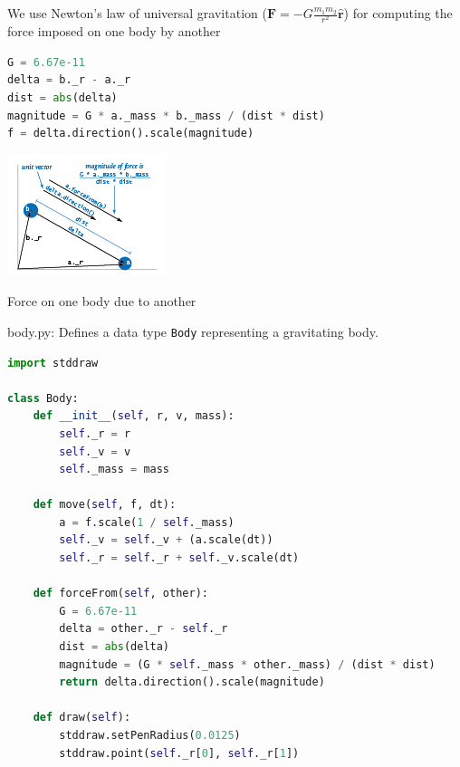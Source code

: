 \documentclass[8pt,a4paper,compress,handout]{beamer}
\begin{document}
\begin{frame}[fragile]
We use Newton's law of universal gravitation ($\mathbf{F}=-G\frac{m_1m_2}{r^2}\hat{\mathbf{r}}$) for computing the force imposed on one body by another

\begin{lstlisting}[language=Python]
G = 6.67e-11
delta = b._r - a._r
dist = abs(delta)
magnitude = G * a._mass * b._mass / (dist * dist)
f = delta.direction().scale(magnitude)
\end{lstlisting}

\begin{center}
\includegraphics[scale=0.5]{figures/vector_force.png}

\smallskip

\tiny Force on one body due to another
\end{center}
\end{frame}

\begin{frame}[fragile]
\begin{framed}
\tiny body.py: Defines a data type \lstinline{Body} representing a gravitating body.
\end{framed}

\begin{lstlisting}[language=Python]
import stddraw

class Body:
    def __init__(self, r, v, mass):
        self._r = r
        self._v = v
        self._mass = mass

    def move(self, f, dt):
        a = f.scale(1 / self._mass)
        self._v = self._v + (a.scale(dt))
        self._r = self._r + self._v.scale(dt)

    def forceFrom(self, other):
        G = 6.67e-11
        delta = other._r - self._r
        dist = abs(delta)
        magnitude = (G * self._mass * other._mass) / (dist * dist)
        return delta.direction().scale(magnitude)

    def draw(self):
        stddraw.setPenRadius(0.0125)
        stddraw.point(self._r[0], self._r[1])
\end{lstlisting}
\end{frame}
\end{document}
